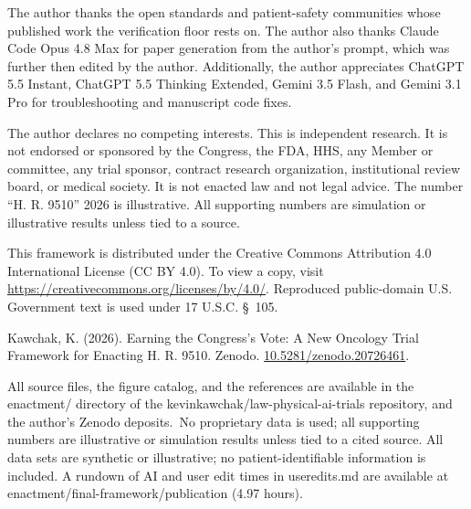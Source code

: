 
\clearpage
{}
The author thanks the open standards and patient-safety communities whose published
work the verification floor rests on. The author also thanks Claude Code Opus 4.8 Max for paper generation from the author's prompt, which was further then edited by the author. Additionally, the author appreciates ChatGPT 5.5 Instant, ChatGPT 5.5 Thinking Extended, Gemini 3.5 Flash, and Gemini 3.1 Pro for troubleshooting and manuscript code fixes. 

The author declares no competing interests. This is independent research. It is not endorsed or sponsored by the Congress, the
FDA, HHS, any Member or committee, any trial sponsor, contract research
organization, institutional review board, or medical society. It is not enacted law
and not legal advice. The number ``H. R. 9510'' 2026 is illustrative. All supporting numbers are simulation or illustrative results unless tied to a source.


This framework is distributed under the Creative Commons Attribution 4.0
International License (CC BY 4.0). To view a copy, visit
\url{https://creativecommons.org/licenses/by/4.0/}. Reproduced public-domain U.S.
Government text is used under 17 U.S.C. \S~105. 

Kawchak, K. (2026). Earning the Congress's Vote: A New Oncology Trial Framework for Enacting H. R. 9510. Zenodo. \href{https://doi.org/10.5281/zenodo.20726461}{10.5281/zenodo.20726461}.

All source files, the figure catalog, and the references are available in the enactment/ directory of the kevinkawchak/law-physical-ai-trials
repository, and the author's Zenodo deposits.\ No proprietary data is used; all supporting numbers are illustrative or
simulation results unless tied to a cited source. All data sets are synthetic or illustrative; no patient-identifiable information is included. A rundown of AI and user edit times in useredits.md are available at enactment/final-framework/publication (4.97 hours).

  
